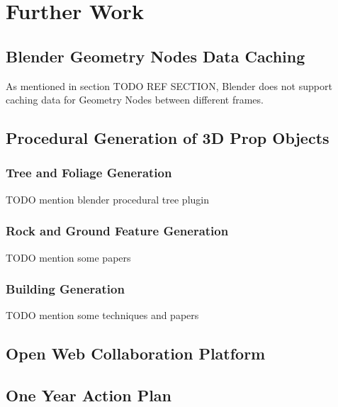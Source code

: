 \chapter{Further Work}
\label{chapter:further-work}

\section{Blender Geometry Nodes Data Caching}
\label{sec:future-blender-geom-nodes-data-caching}

As mentioned in section TODO REF SECTION, Blender does not support caching data for Geometry Nodes between different frames.

\section{Procedural Generation of 3D Prop Objects}
\label{sec:future-proc-gen-obj}

\subsection{Tree and Foliage Generation}

TODO mention blender procedural tree plugin

\subsection{Rock and Ground Feature Generation}

TODO mention some papers

\subsection{Building Generation}

TODO mention some techniques and papers

\section{Open Web Collaboration Platform}
\label{sec:future-open-web-collaboration-platform}

\section{One Year Action Plan}
\label{sec:future-one-year-action-plan}
